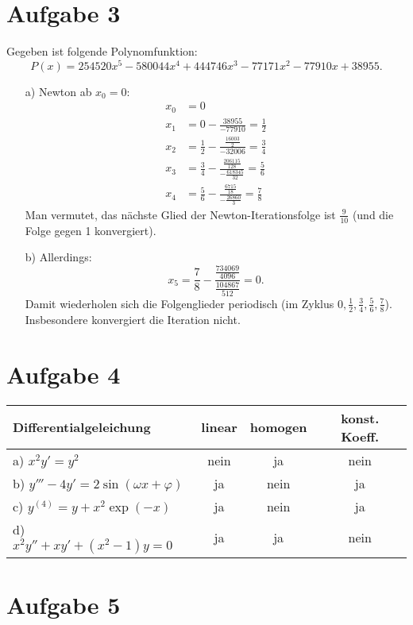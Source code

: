 \documentclass[11pt]{article}
\theoremstyle{plain}
\theoremstyle{definition}
\theoremstyle{remark}
\newcommand{\ph}{\varphi}
\begin{document}
\section*{Aufgabe 3}
Gegeben ist folgende Polynomfunktion: 
\[ P(x) = 254 520 x^5 - 580 044 x^4 + 444 746 x^3 - 77 171 x^2 - 77 910 x + 38 955. \] 
\begin{itemize}
\item[a)] Newton ab $ x_0=0 $: 
\begin{align*}
x_0 &= 0 \\ 
x_1 &= 0 - \frac{38 955}{-77 910} = \frac{1}{2} \\ 
x_2 &= \frac{1}{2} - \frac{\frac{16 003}{2}}{-32 006} = \frac{3}{4} \\ 
x_3 &= \frac{3}{4} - \frac{\frac{206115}{128}}{-\frac{618345}{32}} = \frac{5}{6} \\ 
x_4 &= \frac{5}{6} - \frac{\frac{6715}{18}}{-\frac{26860}{3}} = \frac{7}{8} 
\end{align*} 
Man vermutet, das nächste Glied der Newton-Iterationsfolge ist $ \frac{9}{10} $ (und die Folge gegen 1 konvergiert). 
\item[b)] Allerdings: 
\[ x_5 = \frac{7}{8} - \frac{\frac{734069}{4096}}{\frac{104867}{512}} = 0. \] 
Damit wiederholen sich die Folgenglieder periodisch (im Zyklus $ 0, \frac{1}{2}, \frac{3}{4}, \frac{5}{6}, \frac{7}{8} $). 
Insbesondere konvergiert die Iteration nicht. 
\end{itemize}


\section*{Aufgabe 4}

\begin{tabular}{l|c|c|c}
Differentialgeleichung & linear & homogen & konst. Koeff. \\ 
\hline 
a) $ x^2y' = y^2 $ & nein & ja & nein \\ 
b) $ y'''-4y' = 2\sin(\omega x+\ph) $ & ja & nein & ja \\ 
c) $ y^{(4)} = y + x^2\exp(-x) $ & ja & nein & ja \\ 
d) $x^2y'' + xy' + (x^2-1)y = 0 $ & ja & ja & nein \\ 
\end{tabular} 


\section*{Aufgabe 5} 
\end{document}
